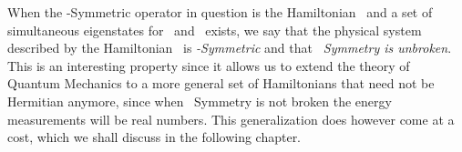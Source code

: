         When the \PT-Symmetric operator in question is the Hamiltonian \hH\ and a set of simultaneous eigenstates for \hH\ and \hPT\ exists, we say that the physical system described by the Hamiltonian \hH\ is \emph{\PT-Symmetric} and that \emph{\PT\ Symmetry is unbroken}. This is an interesting property since it allows us to extend the theory of Quantum Mechanics to a more general set of Hamiltonians that need not be Hermitian anymore, since when \PT\ Symmetry is not broken the energy measurements will be real numbers. This generalization does however come at a cost, which we shall discuss in the following chapter.